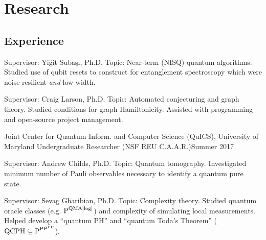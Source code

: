 \documentclass[11pt,letterpaper,serif]{moderncv}
\begin{document}
\section{Research}
\subsection{Experience}
{
	\begin{adjustwidth}{.25in}{}		
		Supervisor: Yi\u{g}it Suba\c{s}\i, Ph.D. \newline
		Topic: Near-term (NISQ) quantum algorithms. Studied use of qubit resets to construct for entanglement spectroscopy which were noise-resilient \textit{and} low-width.
	\end{adjustwidth}
}

{	
	\begin{adjustwidth}{.25in}{}
		Supervisor: Craig Larson, Ph.D. \newline
		Topic: Automated conjecturing and graph theory. Studied conditions for graph Hamiltonicity. Assisted with programming and open-source project management.
	\end{adjustwidth}
}

\cventry{}
{\small Joint Center for Quantum Inform. and Computer Science (QuICS), University of Maryland}
{Undergraduate Researcher (NSF REU C.A.A.R.)}{Summer 2017}{}
{	
	\begin{adjustwidth}{.25in}{}
		Supervisor: Andrew Childs, Ph.D. \newline
		Topic: Quantum tomography. Investigated minimum number of Pauli observables necessary to identify a quantum pure state.
	\end{adjustwidth}
}

{
	\begin{adjustwidth}{.25in}{}
		Supervisor: Sevag Gharibian, Ph.D. \newline
		Topic: Complexity theory. Studied quantum oracle classes  (e.g. {\scriptsize $\textup{P}^{\textup{QMA[log]}}$}) and complexity of simulating local measurements. Helped develop a ``quantum PH'' and ``quantum Toda's Theorem'' ({\scriptsize $\textup{QCPH}\subseteq \textup{P}^{\textup{PP}^{\textup{PP}}}$}).
	\end{adjustwidth}
}
\end{document}
